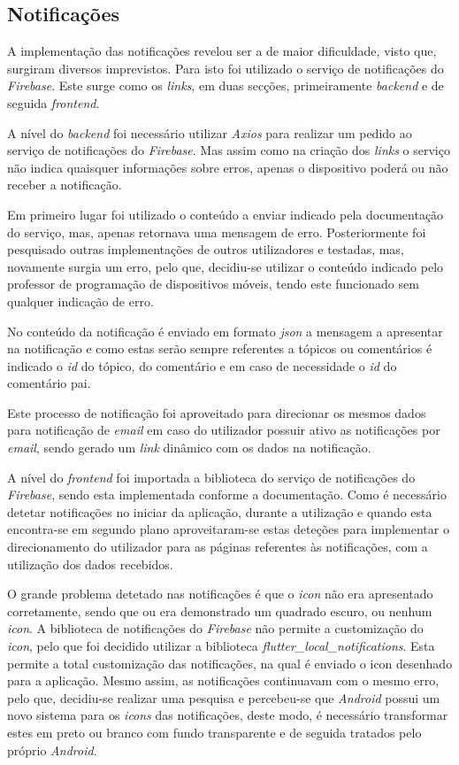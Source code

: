 \subsection{Notificações}

A implementação das notificações revelou ser a de maior dificuldade, visto que, surgiram diversos imprevistos. Para isto foi utilizado o serviço de notificações do \textit{Firebase}. Este surge como os \textit{links}, em duas secções, primeiramente \textit{backend} e de seguida \textit{frontend}.

A nível do \textit{backend} foi necessário utilizar \textit{Axios} para realizar um pedido ao serviço de notificações do \textit{Firebase}. Mas assim como na criação dos \textit{links} o serviço não indica quaisquer informações sobre erros, apenas o dispositivo poderá ou não receber a notificação. 

Em primeiro lugar foi utilizado o conteúdo a enviar indicado pela documentação do serviço, mas, apenas retornava uma mensagem de erro. Posteriormente foi pesquisado outras implementações de outros utilizadores e testadas, mas, novamente surgia um erro, pelo que, decidiu-se utilizar o conteúdo indicado pelo professor de programação de dispositivos móveis, tendo este funcionado sem qualquer indicação de erro. 

No conteúdo da notificação é enviado em formato \textit{\acrshort{json}} a mensagem a apresentar na notificação e como estas serão sempre referentes a tópicos ou comentários é indicado o \textit{id} do tópico, do comentário e em caso de necessidade o \textit{id} do comentário pai.

Este processo de notificação foi aproveitado para direcionar os mesmos dados para notificação de \textit{email} em caso do utilizador possuir ativo as notificações por \textit{email}, sendo gerado um \textit{link} dinâmico com os dados na notificação.

A nível do \textit{frontend} foi importada a biblioteca do serviço de notificações do \textit{Firebase}, sendo esta implementada conforme a documentação. Como é necessário detetar notificações no iniciar da aplicação, durante a utilização e quando esta encontra-se em segundo plano aproveitaram-se estas deteções para implementar o direcionamento do utilizador para as páginas referentes às notificações, com a utilização dos dados recebidos.

O grande problema detetado nas notificações é que o \textit{icon} não era apresentado corretamente, sendo que ou era demonstrado um quadrado escuro, ou nenhum \textit{icon}. A biblioteca de notificações do \textit{Firebase} não permite a customização do \textit{icon}, pelo que foi decidido utilizar a biblioteca \textit{flutter\_local\_notifications}. Esta permite a total customização das notificações, na qual é enviado o icon desenhado para a aplicação. Mesmo assim, as notificações continuavam com o mesmo erro, pelo que, decidiu-se realizar uma pesquisa e percebeu-se que \textit{Android} possui um novo sistema para os \textit{icons} das notificações, deste modo, é necessário transformar estes em preto ou branco com fundo transparente e de seguida tratados pelo próprio \textit{Android}.

